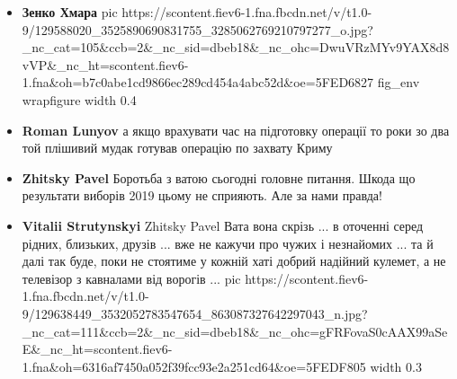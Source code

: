 \begin{itemize}
\item \textbf{Зенко Хмара}
\ifcmt
pic https://scontent.fiev6-1.fna.fbcdn.net/v/t1.0-9/129588020_3525890690831755_3285062769210797277_o.jpg?_nc_cat=105&ccb=2&_nc_sid=dbeb18&_nc_ohc=DwuVRzMYv9YAX8d8vVP&_nc_ht=scontent.fiev6-1.fna&oh=b7c0abe1cd9866ec289cd454a4abc52d&oe=5FED6827
fig_env wrapfigure
width 0.4
\fi

\item \textbf{Roman Lunyov}
а якщо врахувати час на підготовку операції то роки зо два той плішивий мудак
готував операцію по захвату Криму 
\item \textbf{Zhitsky Pavel}
Боротьба з ватою сьогодні головне питання. Шкода що результати виборів 2019 цьому не сприяють. Але за нами правда!

\item \textbf{Vitalii Strutynskyi}
Zhitsky Pavel
Вата вона скрізь ... в оточенні серед рідних, близьких, друзів ... вже не
кажучи про чужих і незнайомих ... та й далі так буде, поки не
стоятиме у кожній хаті добрий надійний кулемет, а не телевізор
з кавналами від ворогів ...
\ifcmt
pic https://scontent.fiev6-1.fna.fbcdn.net/v/t1.0-9/129638449_3532052783547654_863087327642297043_n.jpg?_nc_cat=111&ccb=2&_nc_sid=dbeb18&_nc_ohc=gFRFovaS0cAAX99aSeE&_nc_ht=scontent.fiev6-1.fna&oh=6316af7450a052f39fcc93e2a251cd64&oe=5FEDF805
width 0.3
\fi
\end{itemize}
